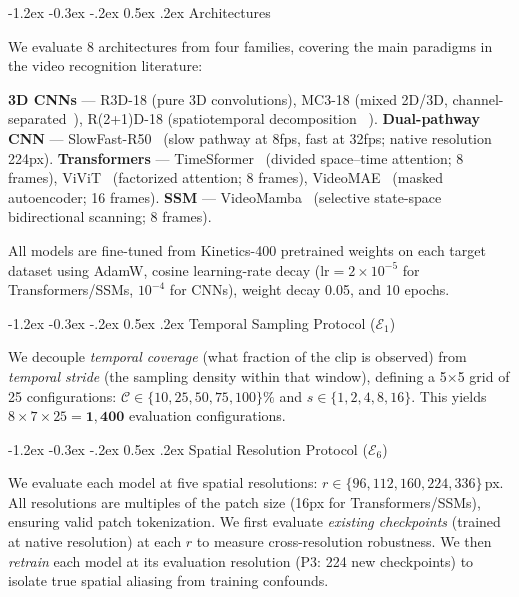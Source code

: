 \documentclass[runningheads]{llncs}
\makeatletter
\renewcommand\subsection{\@startsection{subsection}{2}{\z@}%
                       {-1.2ex \@plus -0.3ex \@minus -.2ex}%
                       {0.5ex \@plus .2ex}%
                       {\normalfont\normalsize\bfseries\boldmath}}
\makeatother
\begin{document}
\subsection{Architectures}

We evaluate 8 architectures from four families, covering the main paradigms
in the video recognition literature:

\noindent\textbf{3D CNNs} — R3D-18 (pure 3D convolutions), MC3-18 (mixed 2D/3D,
channel-separated~\cite{tran2019video}), R(2+1)D-18 (spatiotemporal decomposition%
~\cite{tran2018r2plus1d}).
\textbf{Dual-pathway CNN} — SlowFast-R50~\cite{feichtenhofer2019slowfast} (slow
pathway at 8fps, fast at 32fps; native resolution 224px).
\textbf{Transformers} — TimeSformer~\cite{bertasius2021timesformer} (divided
space--time attention; 8 frames), ViViT~\cite{arnab2021vivit} (factorized
attention; 8 frames), VideoMAE~\cite{tong2022videomae} (masked autoencoder; 16 frames).
\textbf{SSM} — VideoMamba~\cite{li2024videomamba} (selective state-space
bidirectional scanning; 8 frames).

All models are fine-tuned from Kinetics-400 pretrained weights on each target dataset
using AdamW, cosine learning-rate decay ($\text{lr}=2\times10^{-5}$ for Transformers/SSMs,
$10^{-4}$ for CNNs), weight decay 0.05, and 10 epochs.

\subsection{Temporal Sampling Protocol (\texorpdfstring{$\mathcal{E}_1$}{E1})}

We decouple \textit{temporal coverage} (what fraction of the clip is observed)
from \textit{temporal stride} (the sampling density within that window), defining
a 5$\times$5 grid of 25 configurations:
$\mathcal{C} \in \{10, 25, 50, 75, 100\}\%$ and $s \in \{1, 2, 4, 8, 16\}$.
This yields $8 \times 7 \times 25 = \mathbf{1{,}400}$ evaluation configurations.

\subsection{Spatial Resolution Protocol (\texorpdfstring{$\mathcal{E}_6$}{E6})}

We evaluate each model at five spatial resolutions: $r \in \{96, 112, 160, 224, 336\}$\,px.
All resolutions are multiples of the patch size (16px for Transformers/SSMs), ensuring
valid patch tokenization.
We first evaluate \emph{existing checkpoints} (trained at native resolution) at each
$r$ to measure cross-resolution robustness.
We then \emph{retrain} each model at its evaluation resolution (P3: 224 new checkpoints)
to isolate true spatial aliasing from training confounds.
\end{document}
